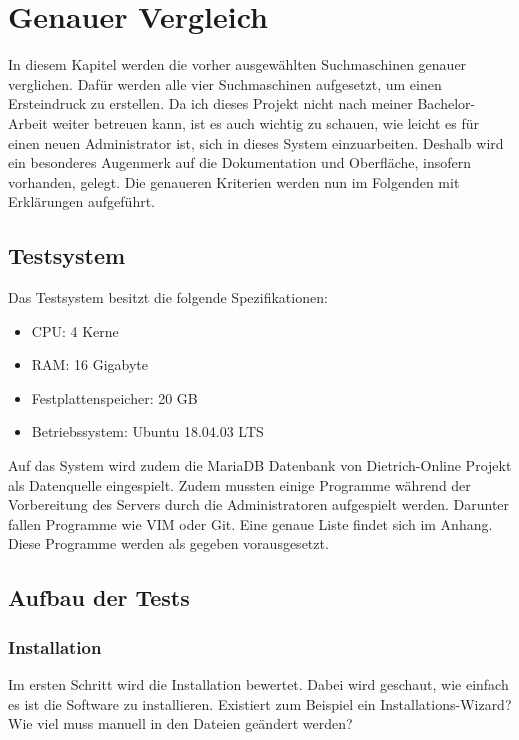 \chapter{Genauer Vergleich}

In diesem Kapitel werden die vorher ausgewählten Suchmaschinen genauer verglichen. Dafür werden alle vier Suchmaschinen aufgesetzt, um einen Ersteindruck zu erstellen. Da ich dieses Projekt nicht nach meiner Bachelor-Arbeit weiter betreuen kann, ist es auch wichtig zu schauen, wie leicht  es für einen neuen Administrator ist, sich in dieses System einzuarbeiten. Deshalb wird ein besonderes Augenmerk auf die Dokumentation und Oberfläche, insofern vorhanden, gelegt. Die genaueren Kriterien werden nun im Folgenden mit Erklärungen aufgeführt.

\section{Testsystem}
Das Testsystem besitzt die folgende Spezifikationen:

\begin{itemize}
    \item CPU: 4 Kerne
    \item RAM: 16 Gigabyte
    \item Festplattenspeicher: 20 GB
    \item Betriebssystem: Ubuntu 18.04.03 LTS
\end{itemize} 

Auf das System wird zudem die MariaDB Datenbank von Dietrich-Online Projekt als Datenquelle eingespielt. Zudem mussten einige Programme während der Vorbereitung des Servers durch die Administratoren aufgespielt werden. Darunter fallen Programme wie VIM oder Git. Eine genaue Liste findet sich im Anhang. Diese Programme werden als gegeben vorausgesetzt.

\section{Aufbau der Tests}

\subsection{Installation}

Im ersten Schritt wird die Installation bewertet. Dabei wird geschaut, wie einfach es ist die Software zu installieren. Existiert zum Beispiel ein Installations-Wizard? Wie viel muss manuell in den Dateien geändert werden?


